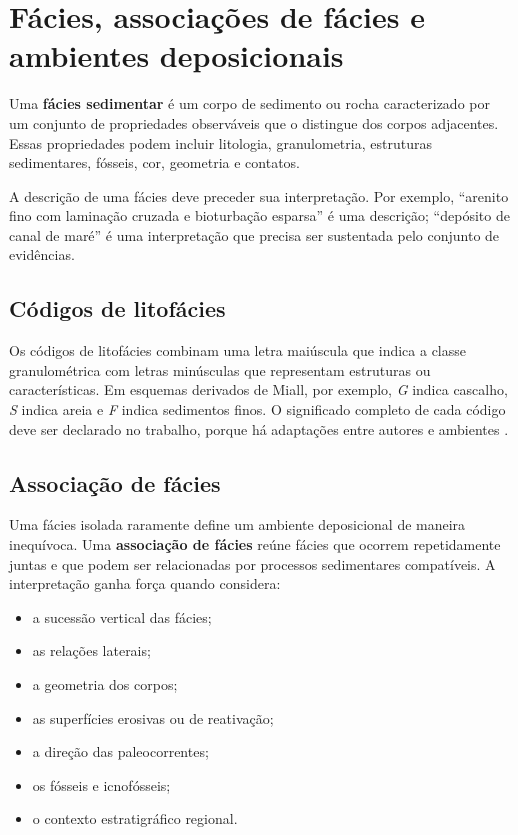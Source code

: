 \section{Fácies, associações de fácies e ambientes deposicionais}

\begin{definicao}
Uma \textbf{fácies sedimentar} é um corpo de sedimento ou rocha caracterizado por um
conjunto de propriedades observáveis que o distingue dos corpos adjacentes. Essas
propriedades podem incluir litologia, granulometria, estruturas sedimentares, fósseis,
cor, geometria e contatos.
\end{definicao}

A descrição de uma fácies deve preceder sua interpretação. Por exemplo, ``arenito fino
com laminação cruzada e bioturbação esparsa'' é uma descrição; ``depósito de canal de
maré'' é uma interpretação que precisa ser sustentada pelo conjunto de evidências.

\subsection{Códigos de litofácies}

Os códigos de litofácies combinam uma letra maiúscula que indica a classe granulométrica
com letras minúsculas que representam estruturas ou características. Em esquemas
derivados de Miall, por exemplo, \emph{G} indica cascalho, \emph{S} indica areia e
\emph{F} indica sedimentos finos. O significado completo de cada código deve ser
declarado no trabalho, porque há adaptações entre autores e ambientes
\parencite{miall1978,nichols2009}.

\subsection{Associação de fácies}

Uma fácies isolada raramente define um ambiente deposicional de maneira inequívoca. Uma
\textbf{associação de fácies} reúne fácies que ocorrem repetidamente juntas e que podem
ser relacionadas por processos sedimentares compatíveis. A interpretação ganha força
quando considera:

\begin{itemize}
  \item a sucessão vertical das fácies;
  \item as relações laterais;
  \item a geometria dos corpos;
  \item as superfícies erosivas ou de reativação;
  \item a direção das paleocorrentes;
  \item os fósseis e icnofósseis;
  \item o contexto estratigráfico regional.
\end{itemize}

